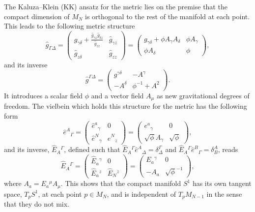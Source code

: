 \documentclass[aps,prd,12pt,superscriptaddress,showpacs,showkeys,longbibliography,reprint,nofootinbib]{revtex4-1}
\begin{document}
The Kaluza--Klein (KK) ansatz for the metric lies on the premise that the compact dimension of $M_N$ is orthogonal to the rest of the manifold at each point. This leads to the following metric structure
\begin{equation}
  \hat{g}_{\Gamma\Delta} =
  \begin{pmatrix}
    g_{\gamma\delta} +\frac{\hat{g}_{\gamma z}\hat{g}_{\delta z}}{\hat{g}_{zz}}&\hat{g}_{\gamma z}\\
    \hat{g}_{z\delta} & \hat{g}_{zz}
  \end{pmatrix}
  =
  \begin{pmatrix}
    g_{\gamma\delta} + \phi A_\gamma A_\delta&\phi A_\gamma\\
    \phi A_{\delta} & \phi
  \end{pmatrix},
\end{equation}
and its inverse
\begin{equation}
  \hat{g}^{\Gamma\Delta}=
  \begin{pmatrix}
    g^{\gamma\delta}&-A^\gamma\\
    -A^{\delta} & \phi^{-1}+A^2
  \end{pmatrix}.
\end{equation}
It introduces a scalar field $\phi$ and a vector field $A_\mu$ as new gravitational degrees of freedom. The vielbein which holds this structure for the metric has the following form
\begin{equation}
  \label{Dvielbein}
  \hat{e}^A{}_{\Gamma} =
  \begin{pmatrix}
    \hat{e}^a{}_{\gamma}& 0\\
    \hat{e}^N{}_{\gamma} & \hat{e}^N{}_{z}
  \end{pmatrix}
  =
  \begin{pmatrix}
    e^a{}_{\gamma}& 0\\
    \sqrt{\phi}A_\gamma & \sqrt{\phi}
  \end{pmatrix},
\end{equation}
and its inverse, $\hat{E}_A{}^{\Gamma}$, defined such that $\hat{E}_A{}^{\Gamma}\hat{e}^A{}_{\Delta}=\delta^\Gamma_{\Delta}$ and $\hat{E}_A{}^{\Gamma}\hat{e}^B{}_{\Gamma}=\delta^A_B$, reads
\begin{equation}
  \label{Dinversevielbein}
  \hat{E}_A{}^{\Gamma} =
  \begin{pmatrix}
    \hat{E}_a{}^{\gamma}& 0\\
    \hat{E}_a{}^{z} & \hat{E}_N{}^{z}
  \end{pmatrix}
  =
  \begin{pmatrix}
    E_a{}^{\gamma}& 0\\
    -A_a & \sqrt{\phi}^{-1}
  \end{pmatrix},
\end{equation}
where $A_a = E_a{}^\mu A_\mu$. This shows that the compact manifold $S^1$ has its own tangent space, $T_pS^1$, at each point $p\in M_N$, and is independent of $T_pM_{N-1}$ in the sense that they do not mix. %
\end{document}
